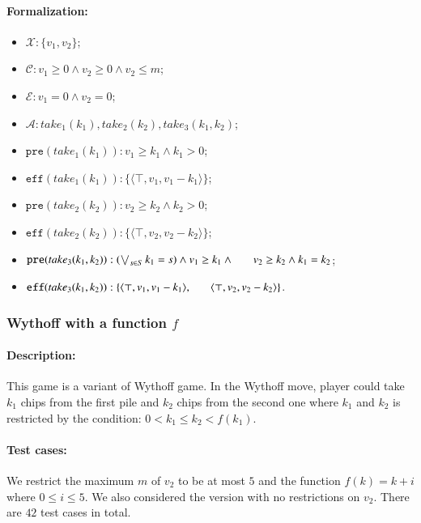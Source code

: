 \documentclass[review]{elsarticle}
\newcommand{\set}[1]{\{ #1 \}}
\newcommand{\tuple}[1]{\langle {#1} \rangle}
\newcommand{\true}{\top}
\newcommand{\statevar}{\mathcal{X}}
\newcommand{\act}{\mathcal{A}}
\newcommand{\constraint}{\mathcal{C}}
\newcommand{\estate}{\mathcal{E}}
\newcommand{\pre}{\mathtt{pre}}
\newcommand{\eff}{\mathtt{eff}}
\begin{document}
\paragraph{Formalization:}
\begin{itemize}
	\item $\statevar: \set{v_1, v_2}$;
	\item $\constraint: v_1 \ge 0 \wedge v_2 \ge 0 \wedge v_2 \le m$;
	\item $\estate: v_1 = 0 \wedge v_2 = 0$;
	\item $\act:take_1(k_1), take_2(k_2), take_3(k_1,k_2)$;
	\item $\pre(take_1(k_1)) : v_1 \ge k_1 \wedge   k_1 > 0$;
	\item $\eff(take_1(k_1)) :  \set{\tuple{\true, v_1 , v_1 -k_1}}$;
	\item $\pre(take_2(k_2)) : v_2 \ge k_2 \wedge  k_2 > 0 $;
	\item $\eff(take_2(k_2)) :  \set{\tuple{\true, v_2 , v_2 -k_2}}$;
	\item $\pre(take_3(k_1, k_2)) : (\bigvee_{s \in S} k_1 = s)  \wedge v_1 \ge k_1 \wedge \\ \hspace*{6mm} v_2 \ge k_2 \wedge k_1 = k_2$;
	\item $\eff(take_3(k_1, k_2)) :  \set{\tuple{\true, v_1 , v_1 -k_1}, \\ \hspace*{6mm} \tuple{\true, v_2 , v_2 -k_2}}$.
\end{itemize}

\subsubsection{Wythoff with a function $f$ \protect\cite{LiuZ2015}}

\paragraph{Description:}
This game is a variant of Wythoff game. 
In the Wythoff move, player could take $k_1$ chips from the first pile and $k_2$ chips from the second one where $k_1$ and $k_2$ is restricted by the condition: $0 < k_1 \le k_2 <f(k_1)$.
\paragraph{Test cases:}
We restrict the maximum $m$ of $v_2$ to be at most $5$ and the function $f(k) = k + i$ where $0 \leq i \leq 5$.
We also considered the version with no restrictions on $v_2$.
There are $42$ test cases in total.
\end{document}
